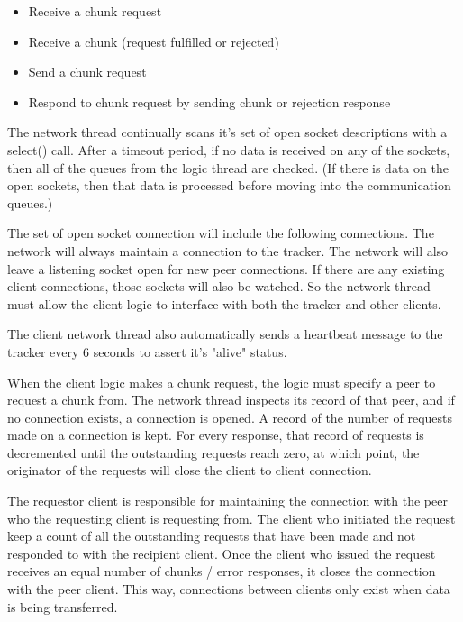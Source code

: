 \begin{itemize}
	\item Receive a chunk request
	\item Receive a chunk (request fulfilled or rejected)
\end{itemize}


\begin{itemize}
	\item Send a chunk request
	\item Respond to chunk request by sending chunk or rejection response
\end{itemize}

The network thread continually scans it's set of open socket descriptions with a select() call. After a timeout period, if no data is received on any of the sockets, then all of the queues from the logic thread are checked. (If there is data on the open sockets, then that data is processed before moving into the communication queues.)

The set of open socket connection will include the following connections. The network will always maintain a connection to the tracker. The network will also leave a listening socket open for new peer connections. If there are any existing client connections, those sockets will also be watched. So the network thread must allow the client logic to interface with both the tracker and other clients.

The client network thread also automatically sends a heartbeat message to the tracker every 6 seconds to assert it's "alive" status.

When the client logic makes a chunk request, the logic must specify a peer to request a chunk from. The network thread inspects its record of that peer, and if no connection exists, a connection is opened. A record of the number of requests made on a connection is kept. For every response, that record of requests is decremented until the outstanding requests reach zero, at which point, the originator of the requests will close the client to client connection.

The requestor client is responsible for maintaining the connection with the peer who the requesting client is requesting from. The client who initiated the request keep a count of all the outstanding requests that have been made and not responded to with the recipient client. Once the client who issued the request receives an equal number of chunks / error responses, it closes the connection with the peer client. This way, connections between clients only exist when data is being transferred.


